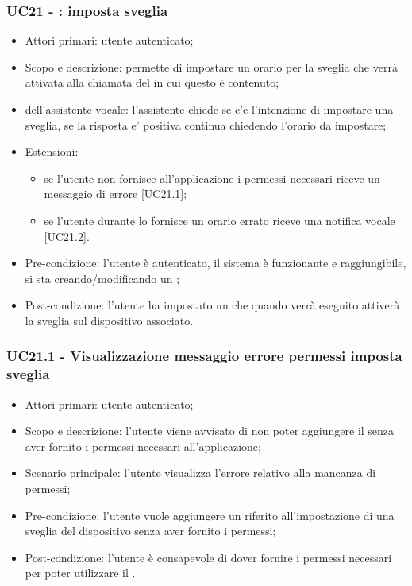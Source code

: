 \subsubsection{UC21 - : imposta sveglia}
\begin{itemize}
	\item  Attori primari: utente autenticato;
	\item  Scopo e descrizione: permette di impostare un orario per la sveglia che verrà attivata alla chiamata del  in cui questo  è contenuto;
	\item  {} dell'assistente vocale: l'assistente chiede se c'e l'intenzione di impostare una sveglia, se la risposta e' positiva continua chiedendo l'orario da impostare;
	\item  Estensioni: 
		   \begin{itemize}
				\item se l'utente non fornisce all'applicazione i permessi necessari riceve un messaggio di errore [UC21.1];
				\item se l'utente durante lo  fornisce un orario errato riceve una notifica vocale [UC21.2].
		   \end{itemize}
	\item  Pre-condizione: l'utente è autenticato, il sistema è funzionante e raggiungibile, si sta creando/modificando un ;
	\item  Post-condizione: l'utente ha impostato un  che quando verrà eseguito attiverà la sveglia sul dispositivo associato.
\end{itemize}
\subsubsection{UC21.1 - Visualizzazione messaggio errore permessi imposta sveglia}
\begin{itemize}
	\item  Attori primari: utente autenticato;
	\item  Scopo e descrizione: l'utente viene avvisato di non poter aggiungere il  senza aver fornito i permessi necessari all'applicazione;
	\item  Scenario principale: l'utente visualizza l'errore relativo alla mancanza di permessi;
	\item  Pre-condizione: l'utente vuole aggiungere un  riferito all'impostazione di una sveglia del dispositivo  senza aver fornito i permessi;
	\item  Post-condizione: l'utente è consapevole di dover fornire i permessi necessari per poter utilizzare il .
\end{itemize}

